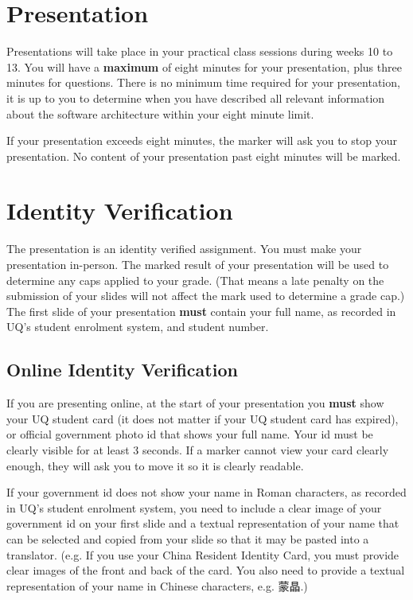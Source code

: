 \documentclass{csse4400}
\begin{document}
\section{Presentation}
Presentations will take place in your practical class sessions during weeks 10 to 13.
You will have a \textbf{maximum} of eight minutes for your presentation, plus three minutes for questions.
There is no minimum time required for your presentation,
it is up to you to determine when you have described all relevant information about the software architecture within your eight minute limit.

If your presentation exceeds eight minutes, the marker will ask you to stop your presentation.
No content of your presentation past eight minutes will be marked.


\section{Identity Verification}
The presentation is an identity verified assignment.
You must make your presentation in-person.
The marked result of your presentation will be used to determine any caps applied to your grade.
(That means a late penalty on the submission of your slides will not affect the mark used to determine a grade cap.)
The first slide of your presentation \textbf{must} contain your full name, as recorded in UQ's student enrolment system, and student number.

\subsection{Online Identity Verification}
If you are presenting online, at the start of your presentation you \textbf{must} show your UQ student card (it does not matter if your UQ student card has expired),
or official government photo id that shows your full name.
Your id must be clearly visible for at least 3 seconds.
If a marker cannot view your card clearly enough, they will ask you to move it so it is clearly readable.

\begin{CJK*}{UTF8}{gbsn}
If your government id does not show your name in Roman characters,
as recorded in UQ's student enrolment system, you need to include a clear image of your government id on your first slide and a textual
representation of your name that can be selected and copied from your slide so that it may be pasted into a translator.
(e.g. If you use your China Resident Identity Card, you must provide clear images of the front and back
of the card. You also need to provide a textual representation of your name in Chinese characters, e.g. 蒙晶.)
\end{CJK*}
\end{document}
